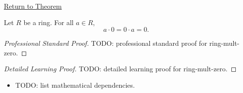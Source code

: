 \newpage
{}
\label{prf:ring-mult-zero}

\begin{remark*}[Return]
\hyperref[prop:ring-mult-zero]{Return to Theorem}
\end{remark*}

\begin{proposition*}
Let $R$ be a ring. For all $a \in R$,
\[
a \cdot 0 = 0 \cdot a = 0.
\]
\end{proposition*}

\begin{proof}[Professional Standard Proof]
\LRAProofBodyStart
TODO: professional standard proof for ring-mult-zero.
\end{proof}

\begin{proof}[Detailed Learning Proof]
\LRAProofBodyStart
TODO: detailed learning proof for ring-mult-zero.
\end{proof}

\begin{remark*}
\end{remark*}

\begin{dependencies}
\begin{itemize}
  \item TODO: list mathematical dependencies.
\end{itemize}
\end{dependencies}

\clearpage
